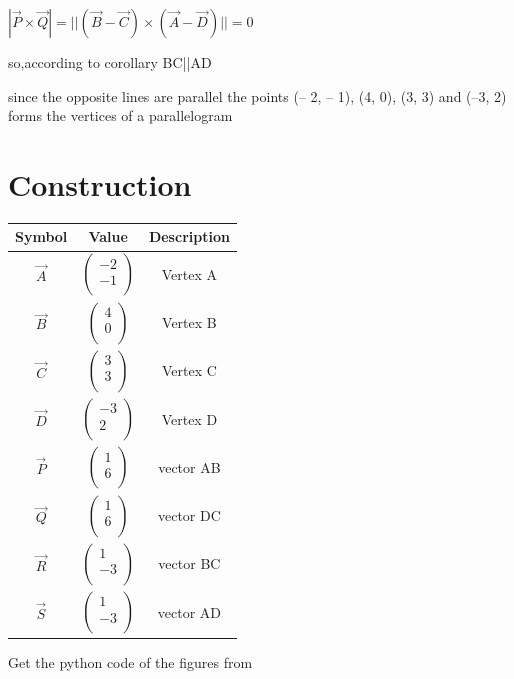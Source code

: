 \documentclass[journal,12pt,twocolumn]{IEEEtran}
\begin{document}
$|\vec{P}\times \vec{Q}|=||(\vec{B}-\vec{C})\times (\vec{A}-\vec{D})||=0$
\unboldmath

so,according to corollary BC||AD
\vspace{0.3cm}

since the opposite lines are parallel the points (– 2, – 1), (4, 0), (3, 3) and (–3, 2) forms the vertices of a parallelogram
\vspace{0.2cm}
\section*{Construction}
\centering
\vspace{0.2cm}
{
\setlength\extrarowheight{2pt}
\begin{tabular}{|c|c|c|}
	\hline
	\textbf{Symbol}&\textbf{Value}&\textbf{Description}\\
	\hline
	$\vec{A}$ & $\begin{pmatrix}-2 \\ -1 \\ \end{pmatrix}$ & Vertex A\\
	\hline
	$\vec{B}$ & $\begin{pmatrix}4 \\ 0 \\ \end{pmatrix}$ & Vertex B\\
	\hline
	$\vec{C}$& $\begin{pmatrix}3 \\ 3 \\ \end{pmatrix}$ & Vertex C\\
	\hline
	$\vec{D}$ & $\begin{pmatrix}-3 \\ 2 \\ \end{pmatrix}$ & Vertex D\\
	\hline
	$\vec{P}$ &$\begin{pmatrix}1 \\ 6 \\ \end{pmatrix}$&vector AB\\
	\hline
	$\vec{Q}$ &$\begin{pmatrix}1 \\ 6 \\ \end{pmatrix}$&vector DC\\
	\hline
	$\vec{R}$ &$\begin{pmatrix}1 \\ -3 \\ \end{pmatrix}$&vector BC\\
	\hline
	$\vec{S}$ &$\begin{pmatrix}1 \\ -3 \\ \end{pmatrix}$&vector AD\\
	\hline
\end{tabular}
}

\vspace{0.6cm}
Get the python code of the figures from
\begin{table}[h]
\large
\centering
{}


\end{table}
\end{document}

